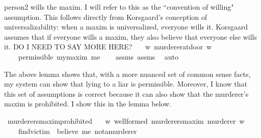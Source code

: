 \begin{isabellebody}
{person2 wills the maxim. I will refer to this as the ``convention of willing" assumption. This follows
directly from Korsgaard's conception of universalizability: when a maxim is universalized, everyone 
wills it. Korsgaard assumes that if everyone wills a maxim, they also believe that everyone else wills it.
DO I NEED TO SAY MORE HERE?%
}\isanewline
\ \ \ {\isachardoublequoteopen}{\isasymforall}w{\isachardot}\ murderer{\isacharunderscore}at{\isacharunderscore}door\ w{\isachardoublequoteclose}\isanewline
%
\isanewline
\ \ \ {\isachardoublequoteopen}{\isasymTurnstile}\ {\isacharparenleft}permissible\ my{\isacharunderscore}maxim\ me{\isacharparenright}{\isachardoublequoteclose}\isanewline
%
\isadelimproof
\ \ %
\endisadelimproof
%
\isatagproof
{}\isamarkupfalse%
\ assms{\isacharparenleft}{}{\isacharparenright}\ assms{\isacharparenleft}{}{\isacharparenright}\ \isamarkupfalse%
\ auto\isanewline
%
%
\endisatagproof
{\isafoldproof}%
%
\isadelimproof
%
\endisadelimproof
%
\begin{isamarkuptext}%
The above lemma shows that, with a more nuanced set of common sense facts, my system can show that 
lying to a liar is permissible. Moreover, I know that this set of assumptions is correct because it 
can also show that the murderer's maxim is prohibited. I show this in the lemma below.%
\end{isamarkuptext}\isamarkuptrue%
\isamarkupfalse%
\ murderers{\isacharunderscore}maxim{\isacharunderscore}prohibited{}{\isacharcolon}\isanewline
\ \ \ {\isachardoublequoteopen}{\isasymforall}w{\isachardot}\ well{\isacharunderscore}formed\ murderers{\isacharunderscore}maxim\ murderer\ w{\isachardoublequoteclose}\isanewline
%
\isanewline
\ \ \ {\isachardoublequoteopen}{\isasymTurnstile}\ {\isacharparenleft}find{\isacharunderscore}victim\ \isactrlbold {\isasymrightarrow}\ {\isacharparenleft}believe\ me\ not{\isacharunderscore}a{\isacharunderscore}murderer{\isacharparenright}{\isacharparenright}{\isachardoublequoteclose}\isanewline

\end{isabellebody}
